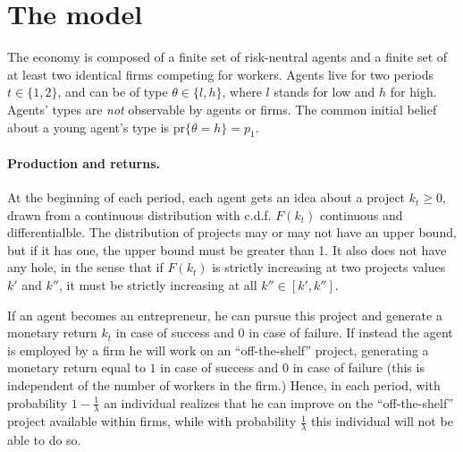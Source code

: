 \documentclass[12pt,american]{paper}
\theoremstyle{remark}
\begin{document}
\section{The model}\label{sec:model}
The economy is composed of a finite set of risk-neutral agents and a finite set of at least two identical firms competing for workers. Agents live for two periods $t\in\{1,2\}$, and can be of type $\theta\in\{l,h\}$, where $l$ stands for low and $h$ for high. Agents' types are \textit{not} observable by agents or firms. The common initial belief about a young agent's type is $\mbox{pr}\{\theta=h\}=p_1$.


\paragraph{Production and returns.}

At the beginning of each period,  each agent gets an idea about a project $k_t\geq 0$, drawn  from a continuous distribution with c.d.f. $F(k_t)$  continuous and differentialble. The distribution of projects may or may not have an upper bound, but if it has one, the upper bound must be greater than 1. It also does not have any hole, in the sense that if $F(k_t)$ is strictly increasing at two projects values $k'$ and $k''$, it must be strictly increasing at all $k''\in[k',k'']$.

If an agent becomes an entrepreneur, he can pursue this project and generate a monetary return $k_t$ in case of success and $0$ in case of failure. If instead the agent is employed by a firm he will work on an ``off-the-shelf'' project, generating a monetary return equal to $1$ in case of success and $0$ in case of failure (this is independent of the number of workers in the firm.) Hence, in each period, with probability $1-\frac{1}{\lambda}$ an individual realizes that he can improve on the ``off-the-shelf'' project available within firms, while with probability $\frac{1}{\lambda}$ this individual will not be able to do so.
\end{document}
